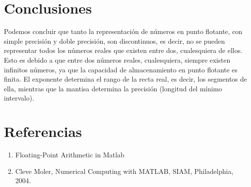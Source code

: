 \documentclass[12pt]{article}
\begin{document}
\section*{Conclusiones}
Podemos concluir que tanto la representación de números en punto flotante, con simple precisión y doble precisión, son discontinuos, es decir, no se pueden representar todos los números reales que existen entre dos, cualesquiera de ellos. Esto es debido a que entre dos números reales, cualesquiera, siempre existen infinitos números, ya que la capacidad de almacenamiento en punto flotante es finita. El exponente determina el rango de la recta real, es decir, los segmentos de ella, mientras que la mantisa determina la precisión (longitud del mínimo intervalo).
\section*{Referencias}
\begin{enumerate}
\item Floating-Point Arithmetic in Matlab
\item Cleve Moler, Numerical Computing with MATLAB, SIAM, Philadelphia, 2004.
\end{enumerate}
\end{document}
